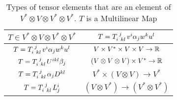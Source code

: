 \documentclass{report}
\begin{document}
\begin{table}[htpb]
	\centering
	\caption{Types of tensor elements that are an element of $V^* \otimes V \otimes V^* \otimes V^*$. $T$ is a Multilinear Map}
	\label{tab:v*tpvtpv*tpv*}
	\begin{tabular}{|cc|}
		\hline
		$T \in V^* \otimes V \otimes V^* \otimes V^*$ & $T = T\indices{_i^j_{kl}} v^i\alpha_j w^k u^l $ \\
		\hline
		$T = T\indices{_i^j_{kl}} v^i\alpha_j w^k u^l $ & $V \times V^* \times V \times V \to \R$\\
		$T = T\indices{_i^j_{kl}} U^{ikl}\beta_j $ & $(V \otimes V \otimes V) \times V^* \to \R$\\
		$T= T\indices{_i^j_{kl}} \alpha_j D^{kl}$ & $V^* \times \left( V \otimes V \right) \to V^*$  \\
		$T= T\indices{_i^j_{kl}}L_j^i$ & $\left( V \otimes V^* \right) \to \left(V^* \otimes V^*  \right)$  \\
		\hline
	\end{tabular}
\end{table}


\end{document}
